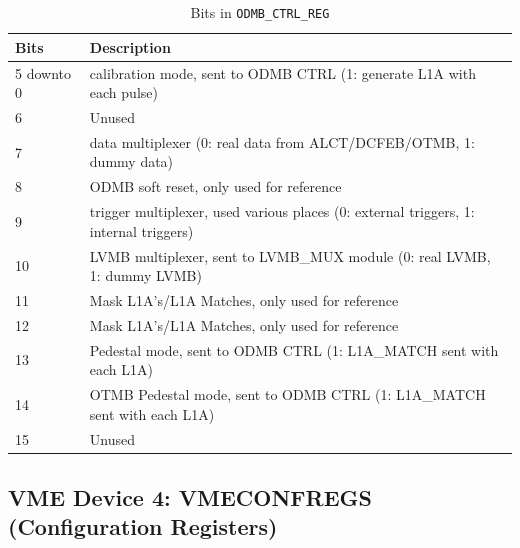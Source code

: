\documentclass[10pt,a4paper]{article}
\begin{document}
\begin{table}[H]
\begin{tabular}{|l|l|} \hline
Bits& Description\\ \hline
5 downto 0& calibration mode, sent to ODMB CTRL (1: generate L1A with each pulse)\\ \hline
6& Unused \\ \hline
7& data multiplexer (0: real data from ALCT/DCFEB/OTMB, 1: dummy data)\\ \hline
8& ODMB soft reset, only used for reference\\ \hline
9& trigger multiplexer, used various places (0: external triggers, 1: internal triggers)\\ \hline 
10& LVMB multiplexer, sent to LVMB\_MUX module (0: real LVMB, 1: dummy LVMB)\\ \hline
11& Mask L1A's/L1A Matches, only used for reference \\ \hline
12& Mask L1A's/L1A Matches, only used for reference \\ \hline
13& Pedestal mode, sent to ODMB CTRL (1: L1A\_MATCH sent with each L1A)\\ \hline 
14& OTMB Pedestal mode, sent to ODMB CTRL (1: L1A\_MATCH sent with each L1A)\\ \hline
15& Unused \\ \hline	
\end{tabular}
\caption{Bits in \texttt{ODMB\_CTRL\_REG}}
\label{tab:odmbctrlbits}
\end{table}

\subsection{VME Device 4: VMECONFREGS (Configuration Registers)}
\end{document}
